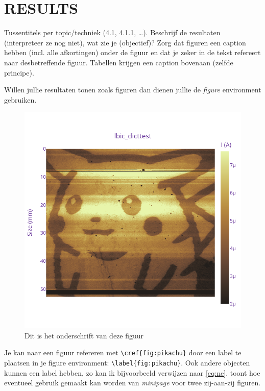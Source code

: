 \section{RESULTS}
Tussentitels per topic/techniek (4.1, 4.1.1, \dots).
Beschrijf de resultaten (interpreteer ze nog niet), wat zie je (objectief)?
Zorg dat figuren een caption hebben (incl. alle afkortingen) onder de figuur en dat je zeker in de tekst refereert naar desbetreffende figuur. 
Tabellen krijgen een caption bovenaan (zelfde principe).

Willen jullie resultaten tonen zoals figuren dan dienen jullie de \textit{figure} environment gebruiken.

\begin{figure}[!htpb]
    \centering
    \includegraphics[width=\linewidth]{Figures/newplot(4).png}
    \caption{Dit is het onderschrift van deze figuur}
    \label{fig:pikachu}
\end{figure}

Je kan naar een figuur refereren met \lstinline!\cref{fig:pikachu}! door een label te plaatsen in je figure environment: \lstinline!\label{fig:pikachu}!.
Ook andere objecten kunnen een label hebben, zo kan ik bijvoorbeeld verwijzen naar \cref{eq:ne}.
 toont hoe eventueel gebruik gemaakt kan worden van \textit{minipage} voor twee zij-aan-zij figuren.

